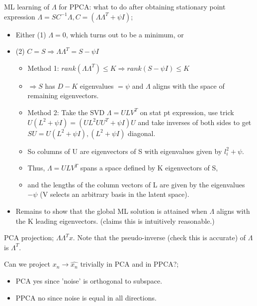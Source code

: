 \documentclass{article}
\begin{document}
ML learning of $\Lambda$ for PPCA: what to do after obtaining stationary point expression $\Lambda = SC^{-1}\Lambda, C=(\Lambda\Lambda^T+\psi I)$; \begin{itemize}
	\item Either (1) $\Lambda=0$, which turns out to be a minimum, or
	\item (2) $C=S \Rightarrow \Lambda\Lambda^T=S-\psi I$
	\begin{itemize}
		\item Method 1: $rank(\Lambda\Lambda^T)\leq K\Rightarrow rank(S-\psi I) \leq K$
		\item $\Rightarrow S$ has $D-K$ eigenvalues $=\psi$ and $\Lambda$ aligns with the space of remaining eigenvectors.
		\item Method 2: Take the SVD $\Lambda = ULV^T$ on stat pt expression, use trick $U(L^2+\psi I)=(UL^2UU^T+\psi I)U$ and take inverses of both sides to get $SU=U(L^2+\psi I), (L^2+\psi I)$ diagonal.
		\item So columns of U are eigenvectors of S with eigenvalues given by $l^2_i + \psi$. 
		\item Thus, $\Lambda = ULV^T$ spans a space defined by K eigenvectors of S, 
		\item and the lengths of the column vectors of L are given by the eigenvalues $-\psi$ (V selects an arbitrary basis in the latent space).
	\end{itemize}
\item Remains to show that the global ML solution is attained when $\Lambda$ aligns with the K leading eigenvectors. (claims this is intuitively reasonable.)
\end{itemize}

PCA projection; $\Lambda\Lambda^Tx$. Note that the pseudo-inverse (check this is accurate) of $\Lambda$ is $\Lambda^T$.

Can we project $x_n \rightarrow \hat{x_n}$ trivially in PCA and in PPCA?; \begin{itemize}
	\item PCA yes since 'noise' is orthogonal to subspace.
	\item PPCA no since noise is equal in all directions.
\end{itemize}
\end{document}
